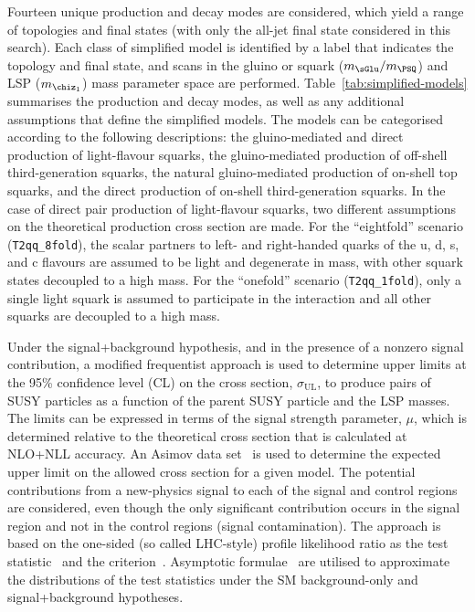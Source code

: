 Fourteen unique production and decay modes are considered, which yield
a range of topologies and final states (with only the all-jet final
state considered in this search). Each class of simplified model is
identified by a label that indicates the topology and final state, and
scans in the gluino or squark ($m_{\sGlu} / m_{\PSQ}$) and LSP
($m_{\chiz_1}$) mass parameter space are performed.
Table~\ref{tab:simplified-models} summarises the production and decay
modes, as well as any additional assumptions that define the
simplified models. The models can be categorised according to the
following descriptions: the gluino-mediated and direct production of
light-flavour squarks, the gluino-mediated production of off-shell
third-generation squarks, the natural gluino-mediated production
of on-shell top squarks, and the direct production of on-shell
third-generation squarks. In the case of direct pair production of
light-flavour squarks, two different assumptions on the theoretical 
production cross section are made. For the ``eightfold'' scenario
(\texttt{T2qq\_8fold}), the scalar partners to left- and right-handed
quarks of the u, d, s, and c flavours are assumed to be light and
degenerate in mass, with other squark states decoupled to a high
mass. For the ``onefold'' scenario (\texttt{T2qq\_1fold}), only a
single light squark is assumed to participate in the interaction and
all other squarks are decoupled to a high mass.

Under the signal+background hypothesis, and in the presence of a
nonzero signal contribution, a modified frequentist approach is used
to determine upper limits at the 95\% confidence level (CL) on the
cross section, $\sigma_\text{UL}$, to produce pairs of SUSY particles
as a function of the parent SUSY particle and the LSP masses. The
limits can be expressed in terms of the signal strength parameter,
$\mu$, which is determined relative to the theoretical cross section
that is calculated at NLO+NLL accuracy. An Asimov data
set~\cite{Cowan:2010js} is used to determine the expected upper limit
on the allowed cross section for a given model.  The potential
contributions from a new-physics signal to each of the signal and
control regions are considered, even though the only significant
contribution occurs in the signal region and not in the control
regions (\ie signal contamination). The approach is based on the
one-sided (so called LHC-style) profile likelihood ratio as the test
statistic~\cite{CMS-NOTE-2011-005} and the \cls criterion~\cite{junk,
  read}. Asymptotic formulae~\cite{Cowan:2010js} are utilised to
approximate the distributions of the test statistics under the SM
background-only and signal+background hypotheses.

